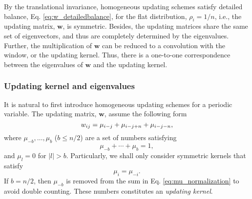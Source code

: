 \documentclass[reprint, floatfix]{revtex4-1}
\begin{document}
By the translational invariance,
homogeneous updating schemes
satisfy detailed balance,
Eq. \eqref{eq:w_detailedbalance},
for the flat distribution, $\rho_i = 1/n$,
i.e., the updating matrix, $\mathbf w$,
is symmetric.
%
Besides, the updating matrices
share the same set of eigenvectors,
and thus are completely determined
by the eigenvalues.
%
Further, the multiplication of $\mathbf w$
can be reduced to a convolution with the window,
or the updating kernel.
%
Thus,
there is a one-to-one correspondence between
the eigenvalues of $\mathbf w$
and the updating kernel.



\subsubsection{\label{sec:bandkernel}
Updating kernel and eigenvalues}






It is natural to first introduce homogeneous updating schemes
for a periodic variable\cite{dama2014}.
%
The updating matrix, $\mathbf w$,
assume the following form
%
\begin{equation}
  w_{ij}
  =
  \mu_{i-j}
  +
  \mu_{i-j+n}
  +
  \mu_{i-j-n}
  ,
\notag
\end{equation}
%
where
$\mu_{-b}, \dots, \mu_b$ ($b \le n/2$)
are a set of numbers satisfying
%
\begin{equation}
  \mu_{-b} + \cdots + \mu_b = 1
  ,
\label{eq:mu_normalization}
\end{equation}
%
and $\mu_l = 0$ for $|l| > b$.
%
Particularly,
we shall only consider symmetric kernels
that satisfy
%
\begin{equation}
  \mu_i = \mu_{-i}
  .
\label{eq:mu_symm}
\end{equation}
%
If $b = n/2$, then $\mu_{-b}$ is removed
from the sum in Eq. \eqref{eq:mu_normalization}
to avoid double counting.
%
These numbers constitutes an \emph{updating kernel}.
\end{document}
